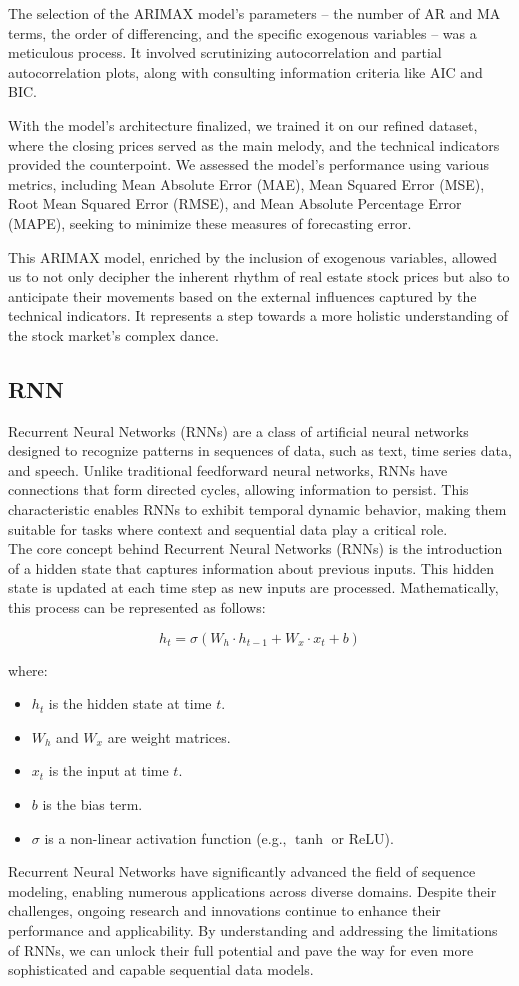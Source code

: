 \documentclass{ieeeojies}
\begin{document}
The selection of the ARIMAX model's parameters – the number of AR and MA terms, the order of differencing, and the specific exogenous variables – was a meticulous process. It involved scrutinizing autocorrelation and partial autocorrelation plots, along with consulting information criteria like AIC and BIC.

With the model's architecture finalized, we trained it on our refined dataset, where the closing prices served as the main melody, and the technical indicators provided the counterpoint. We assessed the model's performance using various metrics, including Mean Absolute Error (MAE), Mean Squared Error (MSE), Root Mean Squared Error (RMSE), and Mean Absolute Percentage Error (MAPE), seeking to minimize these measures of forecasting error.

This ARIMAX model, enriched by the inclusion of exogenous variables, allowed us to not only decipher the inherent rhythm of real estate stock prices but also to anticipate their movements based on the external influences captured by the technical indicators. It represents a step towards a more holistic understanding of the stock market's complex dance.


  \subsection{RNN}
  Recurrent Neural Networks (RNNs) are a class of artificial neural networks designed to recognize patterns in sequences of data, such as text, time series data, and speech. Unlike traditional feedforward neural networks, RNNs have connections that form directed cycles, allowing information to persist. This characteristic enables RNNs to exhibit temporal dynamic behavior, making them suitable for tasks where context and sequential data play a critical role.
  \\ The core concept behind Recurrent Neural Networks (RNNs) is the introduction of a hidden state that captures information about previous inputs. This hidden state is updated at each time step as new inputs are processed. Mathematically, this process can be represented as follows:

  \[
  h_t = \sigma(W_h \cdot h_{t-1} + W_x \cdot x_t + b)
  \]
  
  where:
  \begin{itemize}
      \item $h_t$ is the hidden state at time $t$.
      \item $W_h$ and $W_x$ are weight matrices.
      \item $x_t$ is the input at time $t$.
      \item $b$ is the bias term.
      \item $\sigma$ is a non-linear activation function (e.g., $\tanh$ or $\text{ReLU}$).
  \end{itemize}  
  Recurrent Neural Networks have significantly advanced the field of sequence modeling, enabling numerous applications across diverse domains. Despite their challenges, ongoing research and innovations continue to enhance their performance and applicability. By understanding and addressing the limitations of RNNs, we can unlock their full potential and pave the way for even more sophisticated and capable sequential data models.
\end{document}
